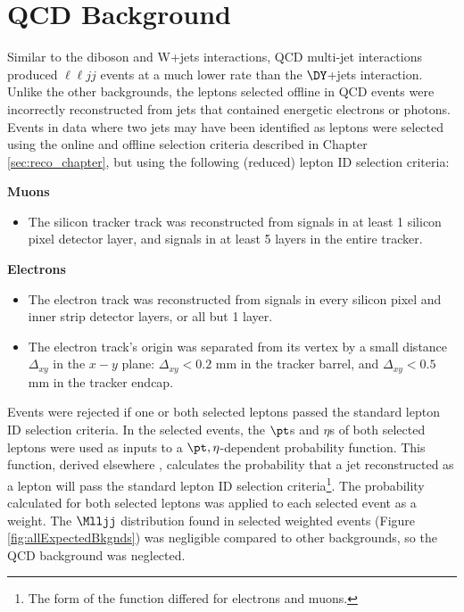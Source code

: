 \section{QCD Background}
\label{sec:qcdBkgnd}
Similar to the diboson and W+jets interactions, QCD multi-jet interactions produced $\ell\ell jj$ events at a much lower rate than the 
$\DY$+jets interaction.  Unlike the other backgrounds, the leptons selected offline in QCD events were incorrectly reconstructed from 
jets that contained energetic electrons or photons.  Events in data where two jets may have been identified as leptons were selected 
using the online and offline selection criteria described in Chapter \ref{sec:reco_chapter}, but using the following (reduced) lepton 
ID selection criteria:

\textbf{Muons}
\begin{itemize}
	\item The silicon tracker track was reconstructed from signals in at least 1 silicon pixel detector layer, and signals in at least 
		5 layers in the entire tracker.
\end{itemize}

\textbf{Electrons}
\begin{itemize}
	\item The electron track was reconstructed from signals in every silicon pixel and inner strip detector layers, or all but 1 layer.
	\item The electron track's origin was separated from its vertex by a small distance $\Delta_{xy}$ in the $x-y$ 
		plane: $\Delta_{xy} < 0.2$ mm in the tracker barrel, and $\Delta_{xy} < 0.5$ mm in the tracker endcap.
\end{itemize}

Events were rejected if one or both selected leptons passed the standard lepton ID selection criteria.  In the selected events, 
the $\pt$s and $\eta$s of both selected leptons were used as inputs to a $\pt,\eta$-dependent probability function.  This function, 
derived elsewhere \cite{ZprimeRunOneAndTwo}, calculates the probability that a jet reconstructed as a lepton will pass the standard lepton 
ID selection criteria\footnote{The form of the function differed for electrons and muons.}.  The probability calculated for both selected 
leptons was applied to each selected event as a weight.  The $\Mlljj$ distribution found in selected weighted events (Figure \ref{fig:allExpectedBkgnds}) 
was negligible compared to other backgrounds, so the QCD background was neglected.

